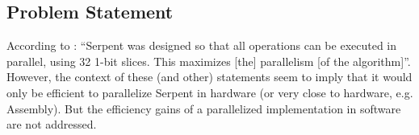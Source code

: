 \subsection{Problem Statement}

According to \cite{wikipedia}: \enquote{Serpent was designed so that all operations can be executed in parallel, using 32 1-bit slices. This maximizes [the] parallelism [of the algorithm]}. However, the context of these (and other) statements seem to imply that it would only be efficient to parallelize Serpent in hardware (or very close to hardware, e.g. Assembly). But the efficiency gains of a parallelized implementation in software are not addressed.
